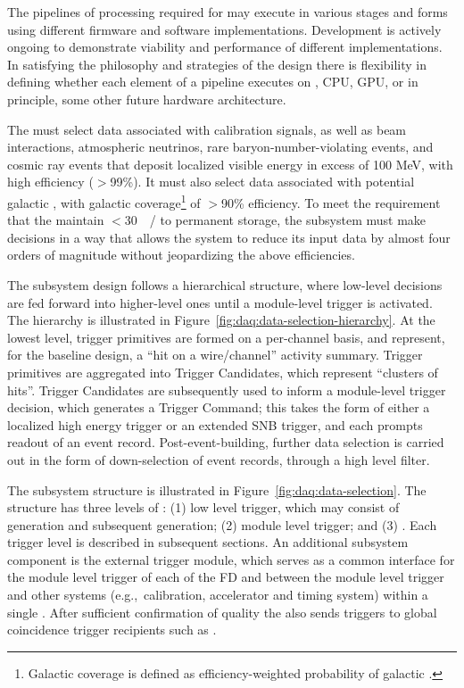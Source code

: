 The pipelines of processing required for  may execute in
various stages and forms using different firmware and software
implementations. 
Development is actively ongoing to demonstrate
viability and performance of different implementations. In satisfying
the philosophy and strategies of the  design there is 
flexibility in defining whether each element of a pipeline executes on
, CPU, GPU, or in principle, some other future hardware
architecture. 

The  must select data associated with calibration
signals, as well as beam interactions,
atmospheric neutrinos, rare baryon-number-violating events, and cosmic
ray events that deposit localized visible energy in excess of 100 MeV, with high efficiency ($>$99\%). 
It must also select data associated with potential galactic , with galactic coverage\footnote{Galactic coverage is defined as efficiency-weighted probability of galactic .} of $>$90\% efficiency.
To meet the requirement that the   maintain
$<$\SI{30}{\peta\byte/\year} to permanent storage, the 
subsystem must make  decisions in a way that allows the  
system to reduce its input data by almost four orders of magnitude
without jeopardizing the above efficiencies.

The  subsystem design follows a hierarchical structure, where low-level
decisions are fed forward into higher-level ones until a  module-level trigger is activated. The hierarchy
is illustrated in Figure~\ref{fig:daq:data-selection-hierarchy}. 
At the lowest level, trigger
primitives are formed on a per-channel basis, and represent, for the
baseline design, a ``hit on
a wire/channel'' activity summary. Trigger primitives are aggregated
into Trigger Candidates, which represent ``clusters of hits''. Trigger
Candidates are subsequently used to inform a module-level trigger decision, which
generates a Trigger Command; this takes the form of either a localized high energy
trigger or an extended SNB trigger, and each prompts readout of an
event record. Post-event-building, further data selection is carried
out in the form of down-selection of event records, through a high
level filter. 

The subsystem structure is illustrated in
Figure~\ref{fig:daq:data-selection}. The structure
has three levels of : (1) low level trigger, which may consist of
 generation and subsequent
 generation; (2) module level trigger; and (3)
. Each trigger level is described in subsequent
sections. An additional subsystem component is the external trigger module,
which serves as a common interface for the
module level trigger of each of the FD  and between
the module level trigger and other systems (e.g.,~calibration,
accelerator and timing system) within a single
. After sufficient confirmation of quality the
 also sends  triggers
to global coincidence trigger recipients such as  .

